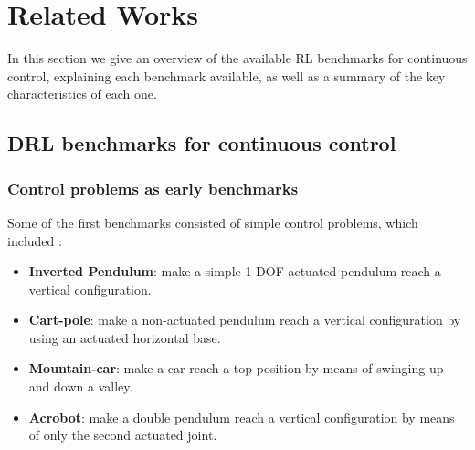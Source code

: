 
\chapter{Related Works}
\label{ch:relatedWorks}

In this section we give an overview of the available RL benchmarks for continuous 
control, explaining each benchmark available, as well as a summary of the key characteristics
 of each one.

\section{DRL benchmarks for continuous control}

    \subsection{Control problems as early benchmarks}

    Some of the first benchmarks consisted of simple control problems, which included :

    \begin{itemize}
        \item \textbf{Inverted Pendulum}: make a simple 1 DOF actuated pendulum reach a vertical configuration.
        \item \textbf{Cart-pole}: make a non-actuated pendulum reach a vertical configuration by using an actuated horizontal base.
        \item \textbf{Mountain-car}: make a car reach a top position by means of swinging up and down a valley.
        \item \textbf{Acrobot}: make a double pendulum reach a vertical configuration by means of only the second actuated joint.
    \end{itemize}


